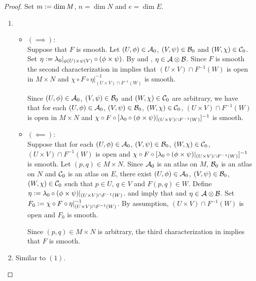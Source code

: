 \documentclass{book}
\begin{document}
\begin{proof}
	Set $m \vcentcolon= \dim M$, $n = \dim N$ and $e = \dim E$. 
	\begin{enumerate}
		\item 
		\begin{itemize}
			\item $(\implies)$: \\
			Suppose that $F$ is smooth. Let $(U, \phi) \in \mathcal{A}_0$, $(V, \psi) \in \mathcal{B}_0$ and $(W, \chi) \in \mathcal{C}_0$. Set $\eta \vcentcolon= \lambda_0|_{\phi(U) \times \psi(V)} \circ (\phi \times \psi)$. By  and , 
			$\eta \in \mathcal{A} \otimes \mathcal{B}$. Since $F$ is smooth the second characterization in  
			implies that $(U \times V) \cap F^{-1}(W)$ is open in $M \times N$ and $\chi \circ F \circ \eta|_{(U \times V) \cap F^{-1}(W)}^{-1}$ is smooth.  
			
			Since $(U, \phi) \in \mathcal{A}_0$, $(V, \psi) \in \mathcal{B}_0$ and $(W, \chi) \in \mathcal{C}_0$ are arbitrary, we have that for each $(U, \phi) \in \mathcal{A}_0$, $(V, \psi) \in \mathcal{B}_0$, $(W, \chi) \in \mathcal{C}_0$, $(U \times V) \cap F^{-1}(W)$ is open in $M \times N$ and $\chi \circ F \circ [\lambda_0 \circ (\phi \times \psi)|_{(U \times V) \cap F^{-1}(W)}]^{-1}$ is smooth.
			\item $(\impliedby)$: \\
			Suppose that for each $(U, \phi) \in \mathcal{A}_0$, $(V, \psi) \in \mathcal{B}_0$, $(W, \chi) \in \mathcal{C}_0$, $(U \times V) \cap F^{-1}(W)$ is open and $\chi \circ F \circ [\lambda_0 \circ (\phi \times \psi)|_{(U \times V) \cap F^{-1}(W)}]^{-1}$ is smooth. Let $(p,q) \in M \times N$. Since $\mathcal{A}_0$ is an atlas on $M$, $\mathcal{B}_0$ is an atlas on $N$ and $\mathcal{C}_0$ is an atlas on $E$, there exist $(U, \phi) \in \mathcal{A}_0$, $(V, \psi) \in \mathcal{B}_0$, $(W, \chi) \in \mathcal{C}_0$ such that $p \in U$, $q \in V$ and $F(p,q) \in W$. Define $\eta \vcentcolon= \lambda_0 \circ (\phi \times \psi)|_{(U \times V) \cap F^{-1}(W)}$.  and  imply that and $\eta \in \mathcal{A} \otimes \mathcal{B}$. Set $F_0 \vcentcolon= \chi \circ F \circ \eta|_{(U \times V) \cap F^{-1}(W)}^{-1}$. By assumption, $(U \times V) \cap F^{-1}(W)$ is open and $F_0$ is smooth. 
			
			Since $(p,q) \in M \times N$ is arbitrary, the third characterization in  implies that $F$ is smooth. 
		\end{itemize}
		\item Similar to $(1)$.
	\end{enumerate}
\end{proof}
\end{document}
